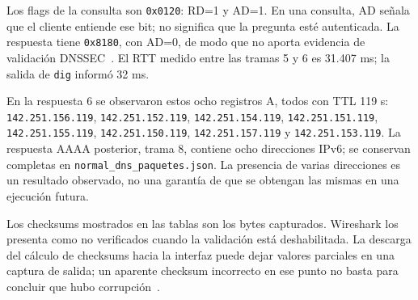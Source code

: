 \documentclass[11pt,a4paper]{article}
\begin{document}
Los flags de la consulta son \texttt{0x0120}: RD=1 y AD=1. En una consulta,
AD señala que el cliente entiende ese bit; no significa que la pregunta esté
autenticada. La respuesta tiene \texttt{0x8180}, con AD=0, de modo que no
aporta evidencia de validación DNSSEC~\cite{rfc6840}. El RTT medido entre las
tramas 5 y 6 es 31.407 ms; la salida de \texttt{dig} informó 32 ms.

En la respuesta 6 se observaron estos ocho registros A, todos con TTL 119 s:
\nolinkurl{142.251.156.119}, \nolinkurl{142.251.152.119},
\nolinkurl{142.251.154.119}, \nolinkurl{142.251.151.119},
\nolinkurl{142.251.155.119}, \nolinkurl{142.251.150.119},
\nolinkurl{142.251.157.119} y \nolinkurl{142.251.153.119}.
La respuesta AAAA posterior, trama 8, contiene ocho direcciones IPv6;
se conservan completas en \nolinkurl{normal_dns_paquetes.json}. La presencia
de varias direcciones es un resultado observado, no una garantía de que
se obtengan las mismas en una ejecución futura.

Los checksums mostrados en las tablas son los bytes capturados. Wireshark
los presenta como no verificados cuando la validación está deshabilitada.
La descarga del cálculo de checksums hacia la interfaz puede dejar valores
parciales en una captura de salida; un aparente checksum incorrecto en ese
punto no basta para concluir que hubo corrupción~\cite{checksums}.
\end{document}
